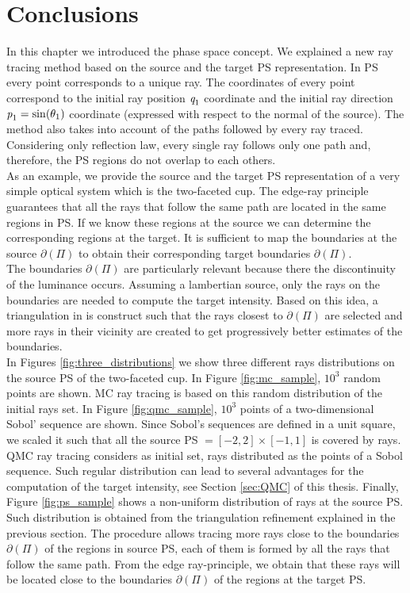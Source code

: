 \section{Conclusions}
In this chapter we introduced the phase space concept. 
We explained a new ray tracing method based on the source and the target PS representation. 
In PS every point corresponds to a unique ray. 
The coordinates of every point correspond to the initial ray position $\textit{q}_1$ coordinate and the initial ray direction $\textit{p}_1 = \sin(\theta_1)$ 
coordinate (expressed with respect to the normal of the source). The method also takes into account of the paths followed by every ray traced.
Considering only reflection law, every single ray follows only one path and, therefore, the PS regions do not overlap to each others. 
\\ \indent
As an example, we provide the source and the target PS representation of a very simple optical system which is the two-faceted cup.
The edge-ray principle guarantees that all the rays that follow the same path are located in the same regions in PS. If we know these regions at the source we can determine the corresponding regions at the target. 
It is sufficient to map the boundaries at the source $\partial$$(\Pi)$ to obtain their corresponding target boundaries $\partial$$(\Pi)$. \\ \indent
The boundaries $\partial$$(\Pi)$ are particularly relevant because there the discontinuity of the luminance occurs. 
Assuming a lambertian source, only the rays on the boundaries are needed to compute the target intensity. 
Based on this idea, a triangulation in  is construct such that the rays closest to $\partial$$(\Pi)$
are selected and more rays in their vicinity are created to get progressively better estimates of the boundaries.
\\ \indent In Figures \ref{fig:three_distributions} we show three different rays distributions on the source PS of the two-faceted cup. In Figure \ref{fig:mc_sample}, $10^3$ random points are shown. MC ray tracing is based on this random distribution of the initial rays set. In Figure \ref{fig:qmc_sample}, $10^3$ points of a two-dimensional Sobol' sequence are shown. 
Since Sobol's sequences are defined in a unit square, we scaled it such that all the source PS $=[-2, 2]\times[-1, 1]$ is covered by rays. QMC ray tracing considers as initial set, rays distributed as the points of a Sobol sequence. Such regular distribution can lead to several advantages for the computation of the target intensity, see Section \ref{sec:QMC} of this thesis. Finally, Figure \ref{fig:ps_sample} shows a non-uniform distribution of rays at the source PS. Such distribution is obtained from the triangulation refinement explained in the previous section. The procedure allows tracing more rays close to the boundaries $\partial$$(\Pi)$ of the regions in source PS, each of them is formed by all the rays that follow the same path. From the edge ray-principle, we obtain that these rays will be located close to the boundaries $\partial$$(\Pi)$ of the regions at the target PS.
